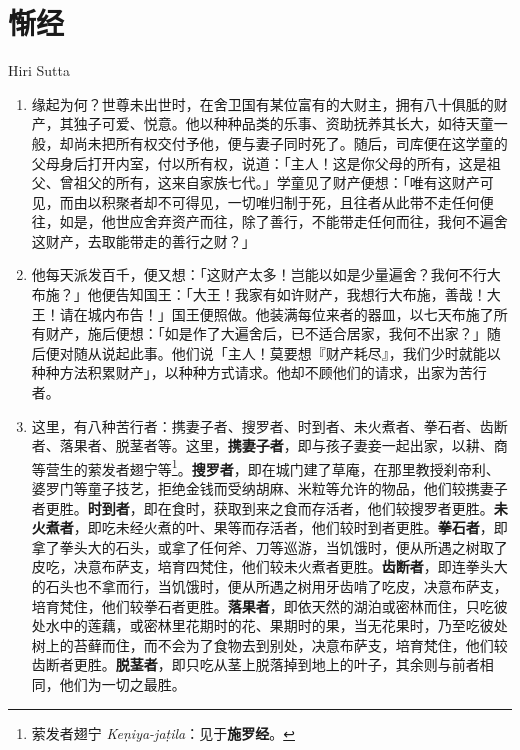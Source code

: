 \section{惭经}

\begin{center}Hiri Sutta\end{center}\vspace{1em}

\begin{enumerate}\item 缘起为何？世尊未出世时，在舍卫国有某位富有的大财主，拥有八十俱胝的财产，其独子可爱、悦意。他以种种品类的乐事、资助抚养其长大，如待天童一般，却尚未把所有权交付予他，便与妻子同时死了。随后，司库便在这学童的父母身后打开内室，付以所有权，说道：「主人！这是你父母的所有，这是祖父、曾祖父的所有，这来自家族七代。」学童见了财产便想：「唯有这财产可见，而由以积聚者却不可得见，一切唯归制于死，且往者从此带不走任何便往，如是，他世应舍弃资产而往，除了善行，不能带走任何而往，我何不遍舍这财产，去取能带走的善行之财？」
\item 他每天派发百千，便又想：「这财产太多！岂能以如是少量遍舍？我何不行大布施？」他便告知国王：「大王！我家有如许财产，我想行大布施，善哉！大王！请在城内布告！」国王便照做。他装满每位来者的器皿，以七天布施了所有财产，施后便想：「如是作了大遍舍后，已不适合居家，我何不出家？」随后便对随从说起此事。他们说「主人！莫要想『财产耗尽』，我们少时就能以种种方法积累财产」，以种种方式请求。他却不顾他们的请求，出家为苦行者。
\item 这里，有八种苦行者：携妻子者、搜罗者、时到者、未火煮者、拳石者、齿断者、落果者、脱茎者等。这里，\textbf{携妻子者}，即与孩子妻妾一起出家，以耕、商等营生的萦发者翅宁等\footnote{萦发者翅宁 \textit{Keṇiya-jaṭila}：见于\textbf{施罗经}。}。\textbf{搜罗者}，即在城门建了草庵，在那里教授刹帝利、婆罗门等童子技艺，拒绝金钱而受纳胡麻、米粒等允许的物品，他们较携妻子者更胜。\textbf{时到者}，即在食时，获取到来之食而存活者，他们较搜罗者更胜。\textbf{未火煮者}，即吃未经火煮的叶、果等而存活者，他们较时到者更胜。\textbf{拳石者}，即拿了拳头大的石头，或拿了任何斧、刀等巡游，当饥饿时，便从所遇之树取了皮吃，决意布萨支，培育四梵住，他们较未火煮者更胜。\textbf{齿断者}，即连拳头大的石头也不拿而行，当饥饿时，便从所遇之树用牙齿啃了吃皮，决意布萨支，培育梵住，他们较拳石者更胜。\textbf{落果者}，即依天然的湖泊或密林而住，只吃彼处水中的莲藕，或密林里花期时的花、果期时的果，当无花果时，乃至吃彼处树上的苔藓而住，而不会为了食物去到别处，决意布萨支，培育梵住，他们较齿断者更胜。\textbf{脱茎者}，即只吃从茎上脱落掉到地上的叶子，其余则与前者相同，他们为一切之最胜。

\end{enumerate}
